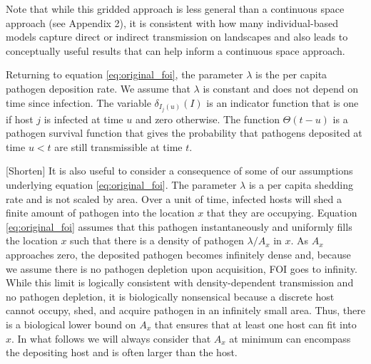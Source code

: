 ﻿\documentclass[11pt]{article}
\begin{document}
Note that while this gridded approach is less general than a continuous space approach (see Appendix 2), it is consistent with how many individual-based models capture direct or indirect transmission on landscapes \citep[e.g.][]{White2018e,Thompson2024} and also leads to conceptually useful results that can help inform a continuous space approach. 

Returning to equation \ref{eq:original_foi}, the parameter $\lambda$ is the per capita pathogen deposition rate. We assume that $\lambda$ is constant and does not depend on time since infection. The variable  $\delta_{I_j(u)}(I)$ is an indicator function that is one if host $j$ is infected at time $u$ and zero otherwise.  The function $\Theta(t - u)$ is a pathogen survival function that gives the probability that pathogens deposited at time $u < t$ are still transmissible at time $t$.  

[Shorten] It is also useful to consider a consequence of some of our assumptions underlying equation \ref{eq:original_foi}. The parameter $\lambda$ is a per capita shedding rate and is not scaled by area. Over a unit of time, infected hosts will shed a finite amount of pathogen into the location $x$ that they are occupying.  Equation \ref{eq:original_foi} assumes that this pathogen instantaneously and uniformly fills the location $x$ such that there is a density of pathogen $\lambda / A_x$ in $x$. %
As $A_x$ approaches zero, the deposited pathogen becomes infinitely dense and, because we assume there is no pathogen depletion upon acquisition, FOI goes to infinity.  While this limit is logically consistent with density-dependent transmission and no pathogen depletion, it is biologically nonsensical because a discrete host cannot occupy, shed, and acquire pathogen in an infinitely small area. Thus, there is a biological lower bound on $A_x$ that ensures that at least one host can fit into $x$.  %
In what follows we will always consider that $A_x$ at minimum can encompass the depositing host and is often larger than the host.

\end{document}

